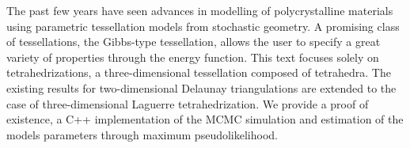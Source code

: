 \documentclass{article}
\begin{document}
	The past few years have seen advances in modelling of polycrystalline materials using parametric tessellation models from stochastic geometry. A promising class of tessellations, the Gibbs-type tessellation, allows the user to specify a great variety of properties through the energy function. 
	This text focuses solely on tetrahedrizations, a three-dimensional tessellation composed of tetrahedra. The existing results for two-dimensional Delaunay triangulations are extended to the case of three-dimensional Laguerre tetrahedrization. We provide a proof of existence, a C++ implementation of the MCMC simulation and estimation of the models parameters through maximum pseudolikelihood.
\end{document}
